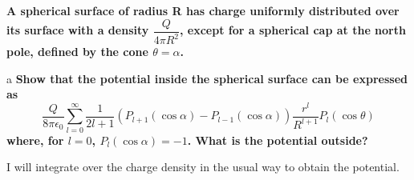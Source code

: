 \begin{homeworkProblem}
\textbf{A spherical surface of radius R has charge uniformly distributed over its surface 
with a density $\dfrac{Q}{4\pi R^2}$, except for a spherical cap at the north pole, defined by the 
cone $\theta = \alpha$.}

\begin{homeworkSection}{a}
\textbf{Show that the potential inside the spherical surface can be expressed as 
\[
\frac{Q}{8 \pi \epsilon_0} \sum\limits_{l=0}^{\infty} \frac{1}{2l+1}\left(P_{l+1}(\cos\alpha) - P_{l-1}(\cos\alpha)\right) \frac{r^l}{R^{l+1}} P_l(\cos\theta)
\]
where, for $l = 0$, $P_l(\cos \alpha) = -1$. What is the potential outside?}


I will integrate over the charge density in the usual way to obtain the potential.


\end{homeworkSection}
\end{homeworkProblem}
